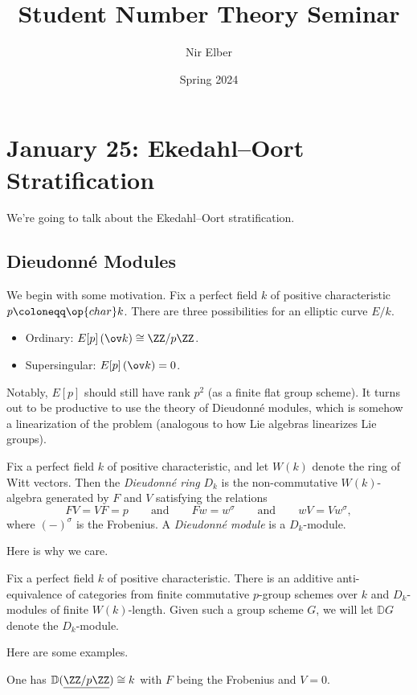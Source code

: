 \documentclass{article}
\title{Student Number Theory Seminar}
\author{Nir Elber}
\date{Spring 2024}
\begin{document}
\maketitle

\tableofcontents

\section{January 25: Ekedahl--Oort Stratification}
We're going to talk about the Ekedahl--Oort stratification.

\subsection{Dieudonn\'e Modules}
We begin with some motivation. Fix a perfect field $k$ of positive characteristic $p\coloneqq\op{char}k$. There are three possibilities for an elliptic curve $E/k$.
\begin{itemize}
	\item Ordinary: $E[p]\left(\ov k\right)\cong\ZZ/p\ZZ$.
	\item Supersingular: $E[p]\left(\ov k\right)=0$.
\end{itemize}
Notably, $E[p]$ should still have rank $p^2$ (as a finite flat group scheme). It turns out to be productive to use the theory of Dieudonn\'e modules, which is somehow a linearization of the problem (analogous to how Lie algebras linearizes Lie groups).
\begin{definition}
	Fix a perfect field $k$ of positive characteristic, and let $W(k)$ denote the ring of Witt vectors. Then the \textit{Dieudonn\'e ring} $D_k$ is the non-commutative $W(k)$-algebra generated by $F$ and $V$ satisfying the relations
	\[FV=VF=p\qquad\text{and}\qquad Fw=w^\sigma\qquad\text{and}\qquad wV=Vw^\sigma,\]
	where $(-)^\sigma$ is the Frobenius. A \textit{Dieudonn\'e module} is a $D_k$-module.
\end{definition}
Here is why we care.
\begin{theorem}
	Fix a perfect field $k$ of positive characteristic. There is an additive anti-equivalence of categories from finite commutative $p$-group schemes over $k$ and $D_k$-modules of finite $W(k)$-length. Given such a group scheme $G$, we will let $\mathbb DG$ denote the $D_k$-module.
\end{theorem}
Here are some examples.
\begin{example}
	One has $\mathbb D(\underline{\ZZ/p\ZZ})\cong k$ with $F$ being the Frobenius and $V=0$.
\end{example}
\end{document}
